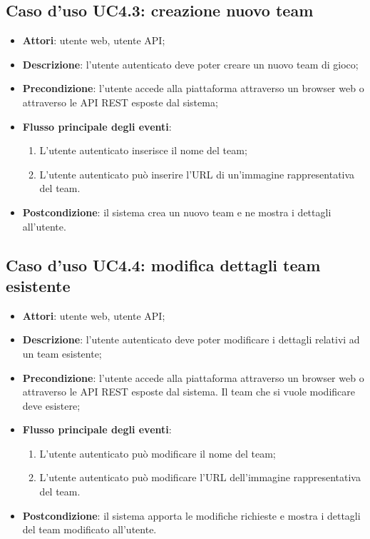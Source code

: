 \subsection{Caso d'uso UC4.3: creazione nuovo team}
\begin{itemize}
\item \textbf{Attori}: utente web, utente API;
\item \textbf{Descrizione}: l'utente autenticato deve poter creare un nuovo team di gioco; 
      \item \textbf{Precondizione}: l'utente accede alla piattaforma attraverso un browser web o attraverso le API REST esposte dal sistema;

        \item \textbf{Flusso principale degli eventi}:
          \begin{enumerate}
          \item L'utente autenticato inserisce il nome del team;
          \item L'utente autenticato può inserire l'URL di un'immagine rappresentativa del team.

      \end{enumerate}
    \item \textbf{Postcondizione}: il sistema crea un nuovo team e ne mostra i dettagli all'utente.
  \end{itemize}
\hypertarget{UC4.4}{}
\subsection{Caso d'uso UC4.4: modifica dettagli team esistente}
\begin{itemize}
\item \textbf{Attori}: utente web, utente API;
\item \textbf{Descrizione}: l'utente autenticato deve poter modificare i dettagli relativi ad un team esistente; 
      \item \textbf{Precondizione}: l'utente accede alla piattaforma attraverso un browser web o attraverso le API REST esposte dal sistema. Il team che si vuole modificare deve esistere;

        \item \textbf{Flusso principale degli eventi}:
          \begin{enumerate}
          \item L'utente autenticato può modificare il nome del team;
          \item L'utente autenticato può modificare l'URL dell'immagine rappresentativa del team.

      \end{enumerate}
    \item \textbf{Postcondizione}: il sistema apporta le modifiche richieste e mostra i dettagli del team modificato all'utente.
  \end{itemize}
\hypertarget{UC4.5}{}
